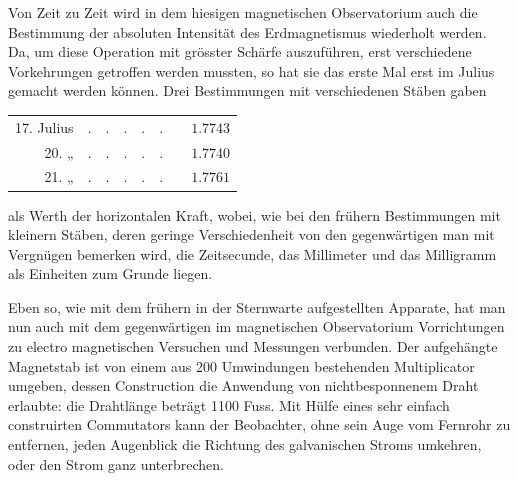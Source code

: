 Von Zeit zu Zeit wird in dem hiesigen magnetischen Observatorium auch die Bestimmung der absoluten Intensität des Erdmagnetismus wiederholt werden. Da, um diese Operation mit grösster Schärfe auszuführen, erst verschiedene Vorkehrungen getroffen werden mussten, so hat sie das erste Mal erst im Julius gemacht werden können. Drei Bestimmungen mit verschiedenen Stäben gaben
\begin{center}
\begin{tabular}{rllllllr}
17. Julius & . & . & . & . & . & & $1.7743$\\
20. \enspace „ & . & . & . & . & . & & $1.7740$\\
21. \enspace „ & . & . & . & . & . & & $1.7761$
\end{tabular}
\end{center}
als Werth der horizontalen Kraft, wobei, wie bei den frühern Bestimmungen mit kleinern Stäben, deren geringe Verschiedenheit von den gegenwärtigen man mit Vergnügen bemerken wird, die Zeitsecunde, das Millimeter und das Milligramm als Einheiten zum Grunde liegen.

Eben so, wie mit dem frühern in der Sternwarte aufgestellten Apparate, hat man nun auch mit dem gegenwärtigen im magnetischen Observatorium Vorrichtungen zu electro magnetischen Versuchen und Messungen verbunden. Der aufgehängte Magnetstab ist von einem aus 200 Umwindungen bestehenden Multiplicator umgeben, dessen Construction die Anwendung von nichtbesponnenem Draht erlaubte: die Drahtlänge beträgt 1100 Fuss. Mit Hülfe eines sehr einfach construirten Commutators kann der Beobachter, ohne sein Auge vom Fernrohr zu entfernen, jeden Augenblick die Richtung des galvanischen Stroms umkehren, oder den Strom ganz unterbrechen.

